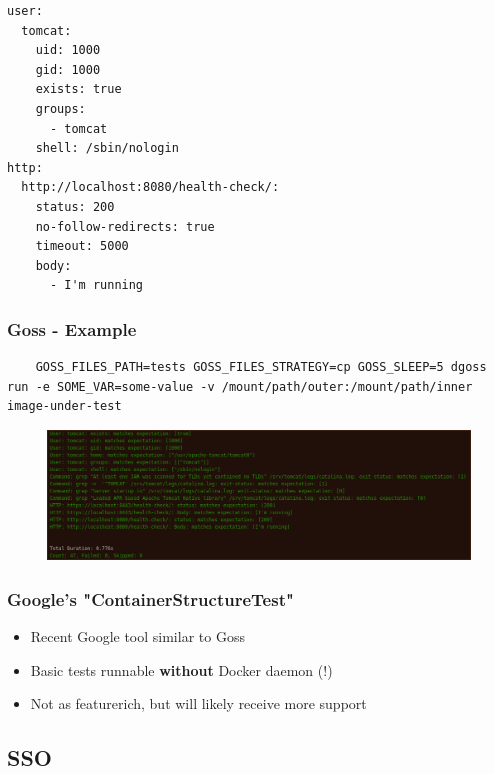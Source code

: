 \documentclass[14pt,aspectratio=169]{beamer}
\begin{document}
{\begin{frame}[fragile]
  \begin{verbatim}
user:
  tomcat:
    uid: 1000
    gid: 1000
    exists: true
    groups:
      - tomcat
    shell: /sbin/nologin
http:
  http://localhost:8080/health-check/:
    status: 200
    no-follow-redirects: true
    timeout: 5000
    body:
      - I'm running
  \end{verbatim}
\end{frame}

\begin{frame}[fragile]
  \frametitle{Goss - Example}
  \begin{verbatim}
    GOSS_FILES_PATH=tests GOSS_FILES_STRATEGY=cp GOSS_SLEEP=5 dgoss run -e SOME_VAR=some-value -v /mount/path/outer:/mount/path/inner image-under-test
  \end{verbatim}
  \begin{figure}
    \includegraphics[width=\textwidth]{images/goss.png}
  \end{figure}
\end{frame}

\begin{frame}
  \frametitle{Google's "ContainerStructureTest"}
  \begin{itemize}
    \item Recent Google tool similar to Goss
    \item Basic tests runnable \textbf{without} Docker daemon (!)
    \item Not as featurerich, but will likely receive more support
  \end{itemize}
\end{frame}

\subsection{SSO}

}
\end{document}
